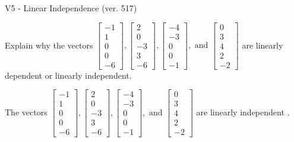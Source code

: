 \begin{exercise}
  \begin{exerciseTitle}V5 - Linear Independence (ver. 517)\end{exerciseTitle}
  \begin{exerciseStatement}
    Explain why the vectors \(\left[\begin{array}{r}
-1 \\
1 \\
0 \\
0 \\
-6
\end{array}\right] , \left[\begin{array}{r}
2 \\
0 \\
-3 \\
3 \\
-6
\end{array}\right] , \left[\begin{array}{r}
-4 \\
-3 \\
0 \\
0 \\
-1
\end{array}\right] , \text{ and } \left[\begin{array}{r}
0 \\
3 \\
4 \\
2 \\
-2
\end{array}\right]\) are linearly dependent or linearly independent.	


  \end{exerciseStatement}
  \begin{exerciseAnswer}
   The vectors \(\left[\begin{array}{r}
-1 \\
1 \\
0 \\
0 \\
-6
\end{array}\right] , \left[\begin{array}{r}
2 \\
0 \\
-3 \\
3 \\
-6
\end{array}\right] , \left[\begin{array}{r}
-4 \\
-3 \\
0 \\
0 \\
-1
\end{array}\right] , \text{ and } \left[\begin{array}{r}
0 \\
3 \\
4 \\
2 \\
-2
\end{array}\right]\) are 
  	 linearly independent  .
  


  \end{exerciseAnswer}
\end{exercise}